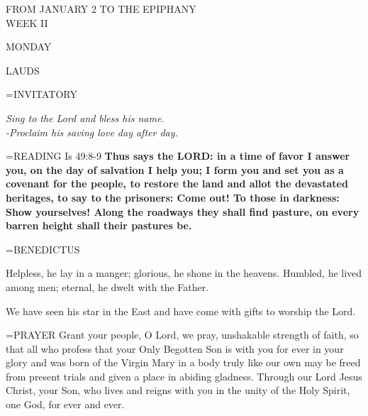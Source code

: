 \begin{center}\normalsize FROM JANUARY 2 TO THE EPIPHANY\\
\footnotesize WEEK II\\
\end{center}

\begin{center}
\normalsize MONDAY
\end{center}

\begin{flushleft}\normalsize LAUDS\\\end{flushleft}

\hangindent=\parindent \small{INVITATORY}
\begin{center}
\textit{Sing to the Lord and bless his name.\\}
\textit{-Proclaim his saving love day after day.\\}
\end{center}

\hangindent=\parindent \small{READING}    Is 49:8-9 \textbf{   Thus says the LORD: in a time of favor I answer you, on the day of salvation I help you; I form you and set you as a covenant for the people, to restore the land and allot the devastated heritages, to say to the prisoners: Come out! To those in darkness: Show yourselves! Along the roadways they shall find pasture, on every barren height shall their pastures be.\\}

\hangindent=\parindent \small BENEDICTUS
\begin{description}[labelindent=\parindent, noitemsep, leftmargin=*]
\item [(before the Epiphany):]  Helpless, he lay in a manger; glorious, he shone in the heavens. Humbled, he lived among men; eternal, he dwelt with the Father.
\item [(Wednesday after the Epiphany):]  We have seen his star in the East and have come with gifts to worship the Lord.
\end{description}


\hangindent=\parindent \small{PRAYER 	Grant your people, O Lord, we pray, unshakable strength of faith, so that all who profess that your Only Begotten Son is with you for ever in your glory and was born of the Virgin Mary in a body truly like our own may be freed from present trials and given a place in abiding gladness. Through our Lord Jesus Christ, your Son, who lives and reigns with you in the unity of the Holy Spirit, one God, for ever and ever.}

